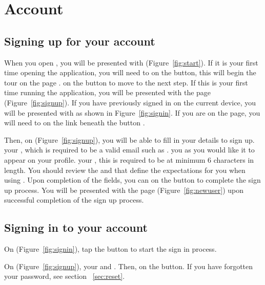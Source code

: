 \section{Account}
\label{sec:account}

\subsection{Signing up for your account}
\label{sec:signup}
When you open \Friending, you will be presented with  (Figure~\ref{fig:start}). If it is your first time opening the application, you will need to  on the  button, this will begin the tour on the page .  on the  button to move to the next step. If this is your first time running the \Friending application, you will be presented with the  page (Figure~\ref{fig:signup}).  If you have previously signed in on the current device, you will be presented with  as shown in Figure~\ref{fig:signin}. If you are on the  page, you will need to  on the  link beneath the button .

Then, on  (Figure~\ref{fig:signup}), you will be able to fill in your details to sign up.  your , which is required to be a valid email such as .  you  as you would like it to appear on your profile.   your , this is required to be at minimum 6 characters in length.  You should review the  and  that define the expectations for you when using \Friending. Upon completion of the fields, you can  on the  button to complete the sign up process.  You will be presented with the  page (Figure~\ref{fig:newuser}) upon successful completion of the sign up process.

\subsection{Signing in to your account}
\label{sec:signin}
On \Screenshot{\fileStart} (Figure~\ref{fig:signin}), tap the  button to start the sign in process.

On  (Figure~\ref{fig:signup}),  your  and .  Then,  on the  button.  If you have forgotten your password, see section ~\ref{sec:reset}. 
